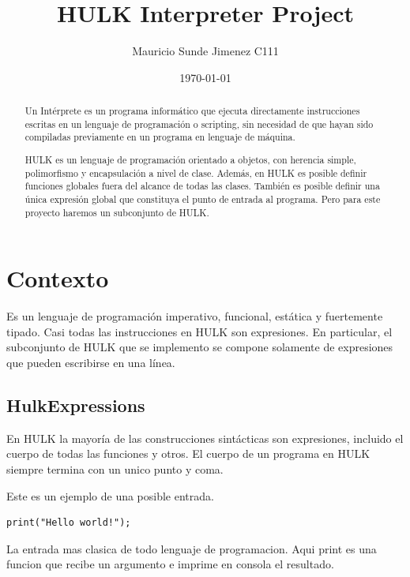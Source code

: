 \documentclass[a4paper, 12pt]{report}
\begin{document}
\title{\bf HULK Interpreter Project }
\author{Mauricio Sunde Jimenez C111}
\date{\today}
\maketitle

\begin{abstract}
    Un Intérprete es un programa informático que ejecuta directamente instrucciones escritas en un lenguaje de programación o scripting, sin necesidad de que hayan sido compiladas previamente en un programa en lenguaje de máquina.

    HULK es un lenguaje de programación orientado a objetos, con herencia simple, polimorfismo y encapsulación a nivel de clase. Además, en HULK es posible definir funciones globales fuera del alcance de todas las clases. También es posible definir una única expresión global que constituya el punto de entrada al programa. Pero para este proyecto haremos un subconjunto de HULK. 
\end{abstract}

\tableofcontents

\newpage

\section*{Contexto}

Es un lenguaje de programación imperativo, funcional, estática y fuertemente tipado. Casi todas las instrucciones en HULK son expresiones. En particular, el subconjunto de HULK que se implemento se compone solamente de expresiones que pueden escribirse en una línea.

\subsection*{HulkExpressions}

En HULK la mayoría de las construcciones sintácticas son expresiones,
incluido el cuerpo de todas las funciones y otros. El cuerpo de un programa en HULK siempre termina con un unico punto y coma.

Este es un ejemplo de una posible entrada.

\begin{lstlisting}
print("Hello world!");
\end{lstlisting}

La entrada mas clasica de todo lenguaje de programacion. Aqui print es una funcion que recibe un argumento e imprime en consola el resultado.
\end{document}
